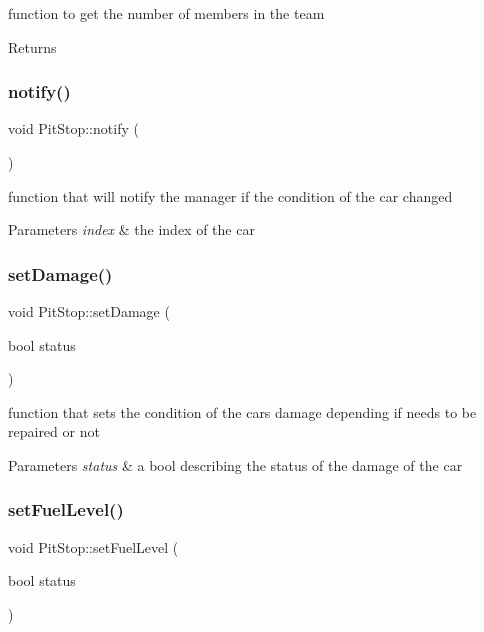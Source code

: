 function to get the number of members in the team \begin{DoxyReturn}{Returns}

\end{DoxyReturn}
\mbox{\label{class_pit_stop_ab5518b2a6052996fdab1a082d0b27874}} 
\subsubsection{\texorpdfstring{notify()}{notify()}}
{\footnotesize\ttfamily void Pit\+Stop\+::notify (\begin{DoxyParamCaption}{ }\end{DoxyParamCaption})}

function that will notify the manager if the condition of the car changed 
\begin{DoxyParams}{Parameters}
{\em index} & the index of the car \\
\hline
\end{DoxyParams}
\mbox{\label{class_pit_stop_a7ae4b0e924c007026f02775a51cdd408}} 
\subsubsection{\texorpdfstring{set\+Damage()}{setDamage()}}
{\footnotesize\ttfamily void Pit\+Stop\+::set\+Damage (\begin{DoxyParamCaption}\item[{bool}]{status }\end{DoxyParamCaption})}

function that sets the condition of the cars damage depending if needs to be repaired or not 
\begin{DoxyParams}{Parameters}
{\em status} & a bool describing the status of the damage of the car \\
\hline
\end{DoxyParams}
\mbox{\label{class_pit_stop_acaa67a8196e7771d5381857570768da6}} 
\subsubsection{\texorpdfstring{set\+Fuel\+Level()}{setFuelLevel()}}
{\footnotesize\ttfamily void Pit\+Stop\+::set\+Fuel\+Level (\begin{DoxyParamCaption}\item[{bool}]{status }\end{DoxyParamCaption})}

